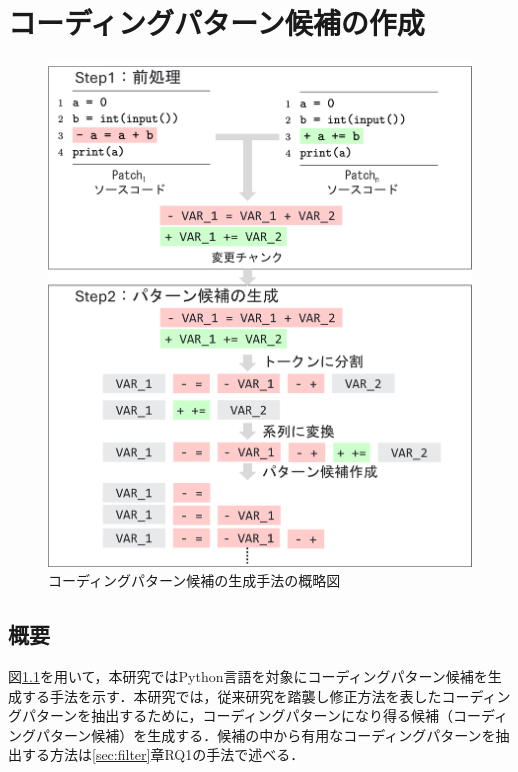 \documentclass[11pt]{jreport}
\begin{document}
\chapter{コーディングパターン候補の作成}\label{sec:pattern}
\begin{figure}[h]
\includegraphics[width=0.95\linewidth]{@BSthesis2024_Noguchi/Noguchi_fig/3_chapter.pdf}
\centering
\caption{コーディングパターン候補の生成手法の概略図}
\label{fig:create_pattern}
\end{figure}

\section{概要}
図\ref{fig:create_pattern}を用いて，本研究ではPython言語を対象にコーディングパターン候補を生成する手法を示す．本研究では，従来研究を踏襲し修正方法を表したコーディングパターンを抽出するために，コーディングパターンになり得る候補（コーディングパターン候補）を生成する．候補の中から有用なコーディングパターンを抽出する方法は\ref{sec:filter}章RQ1の手法で述べる．
\end{document}

